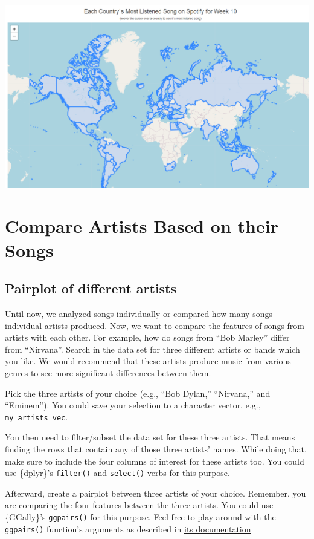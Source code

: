 \documentclass[
  11pt,
]{book}
\newenvironment{tips}[1]
  {
  \begin{itemize}
  \footnotesize
  \renewcommand{\labelitemi}{
    \raisebox{-.7\height}[0pt][0pt]{
      {\setkeys{Gin}{width=3em,keepaspectratio}
        \texttt{[image: images/\#1.png]}}
    }
  }
  \setlength{\fboxsep}{1em}
  \begin{rbox}
  \item
  }
  {
  \end{rbox}
  \end{itemize}
  }
\begin{document}
\begin{center}\includegraphics[width=1\linewidth]{splots/map} \end{center}

\hypertarget{compare-artists-based-on-their-songs}{%
\section{Compare Artists Based on their Songs}\label{compare-artists-based-on-their-songs}}

\hypertarget{pairplot-of-different-artists}{%
\subsection{Pairplot of different artists}\label{pairplot-of-different-artists}}

Until now, we analyzed songs individually or compared how many songs individual artists produced. Now, we want to compare the features of songs from artists with each other. For example, how do songs from ``Bob Marley'' differ from ``Nirvana''.
Search in the data set for three different artists or bands which you like. We would recommend that these artists produce music from various genres to see more significant differences between them.

\begin{tips}r

Pick the three artists of your choice (e.g., ``Bob Dylan,'' ``Nirvana,'' and ``Eminem''). You could save your selection to a character vector, e.g., \texttt{my\_artists\_vec}.

You then need to filter/subset the data set for these three artists. That means finding the rows that contain any of those three artists' names. While doing that, make sure to include the four columns of interest for these artists too. You could use \{dplyr\}'s \texttt{filter()} and \texttt{select()} verbs for this purpose.

Afterward, create a pairplot between three artists of your choice. Remember, you are comparing the four features between the three artists. You could use \href{http://ggobi.github.io/ggally/}{\{GGally\}}'s \texttt{ggpairs()} for this purpose. Feel free to play around with the \texttt{ggpairs()} function's arguments as described in \href{http://ggobi.github.io/ggally/articles/ggpairs.html}{its documentation}

\end{tips}
\end{document}
